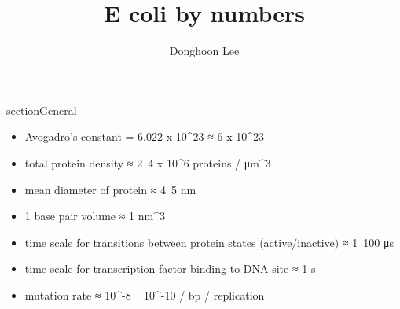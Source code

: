 \documentclass{article}
\title{E coli by numbers}
\author{Donghoon Lee}
\begin{document}
    \maketitle

    section{General}
    \begin{itemize}
        \gdef\NA{#6.022*10^{23}}
        \item Avogadro's constant = 6.022 x 10^{23} ≈ 6 x 10^{23}
        \item total protein density ≈ 2~4 x 10^{6} proteins / μm^{3}
        \item mean diameter of protein ≈ 4~5 nm
        \item 1 base pair volume ≈ 1 nm^{3}
        \item time scale for transitions between protein states (active/inactive) ≈ 1~100 μs
        \item time scale for transcription factor binding to DNA site ≈ 1 s
        \item mutation rate ≈ 10^{-8} ~ 10^{-10} / bp / replication
    \end{itemize}
\end{document}
